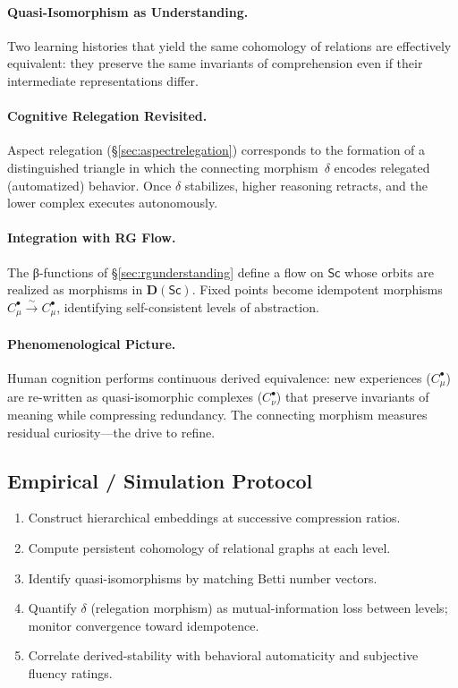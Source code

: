 \documentclass[12pt,a4paper,twoside,openright]{book}
\begin{document}
\paragraph{Quasi-Isomorphism as Understanding.}
Two learning histories that yield the same cohomology of relations
are effectively equivalent:
they preserve the same invariants of comprehension
even if their intermediate representations differ.

\paragraph{Cognitive Relegation Revisited.}
Aspect relegation (§\ref{sec:aspectrelegation})
corresponds to the formation of a distinguished triangle
in which the connecting morphism~$\delta$
encodes relegated (automatized) behavior.
Once $\delta$ stabilizes, higher reasoning retracts,
and the lower complex executes autonomously.

\paragraph{Integration with RG Flow.}
The β-functions of §\ref{sec:rgunderstanding}
define a flow on $\mathsf{Sc}$ whose orbits
are realized as morphisms in $\mathbf{D}(\mathsf{Sc})$.
Fixed points become idempotent morphisms
$C_\mu^\bullet\!\xrightarrow{\sim}\!C_\mu^\bullet$,
identifying self-consistent levels of abstraction.

\paragraph{Phenomenological Picture.}
Human cognition performs continuous derived equivalence:
new experiences ($C_\mu^\bullet$) are re-written
as quasi-isomorphic complexes ($C_\nu^\bullet$)
that preserve invariants of meaning while compressing redundancy.
The connecting morphism measures residual curiosity—the drive to refine.

\subsection*{Empirical / Simulation Protocol}

\begin{enumerate}
\item Construct hierarchical embeddings at successive compression ratios.
\item Compute persistent cohomology of relational graphs at each level.
\item Identify quasi-isomorphisms by matching Betti number vectors.
\item Quantify $\delta$ (relegation morphism) as mutual-information loss
between levels; monitor convergence toward idempotence.
\item Correlate derived-stability with behavioral automaticity
and subjective fluency ratings.
\end{enumerate}
\end{document}
